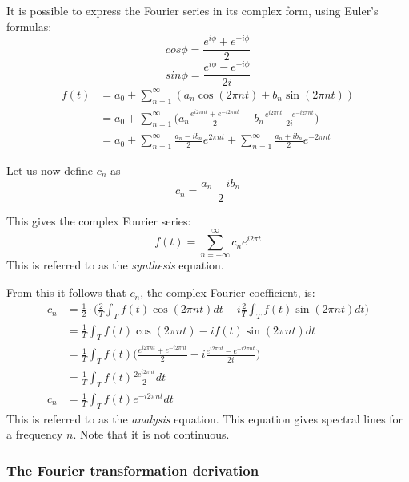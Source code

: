 \documentclass{article}
\begin{document}
It is possible to express the Fourier series in its complex form, using 
Euler's formulas:
$$cos \phi = \frac{e^{i\phi} + e^{-i\phi}}{2}$$
$$sin \phi = \frac{e^{i\phi} - e^{-i\phi}}{2i}$$
\begin{equation*}
	\begin{aligned}
		f(t) &=
		a_0 + \sum^{\infty}_{n=1}(a_n \cos(2 \pi n t) + b_n \sin(2 \pi n t)) \\
		& = a_0 + \sum^{\infty}_{n=1}\Big(
		a_n \frac{e^{i 2 \pi n t} + e^{-i 2 \pi n t}}{2} + 
		b_n \frac{e^{i 2 \pi n t} - e^{-i 2 \pi n t}}{2i}\Big) \\
		&= a_0 + \sum^{\infty}_{n=1} \frac{a_n - ib_n}{2}e^{2 \pi n t} +
		\sum^{\infty}_{n=1} \frac{a_n + ib_n}{2} e^{-2 \pi n t}
	\end{aligned}
\end{equation*}

Let us now define $c_n$ as 
$$c_n = \frac{a_n - i b_n}{2}$$

This gives the complex Fourier series:
\begin{equation*}
	f(t) = \sum^{\infty}_{n = - \infty} c_n e^{i 2 \pi t}
\end{equation*}
This is referred to as the \textit{synthesis} equation.

From this it follows that $c_n$, the complex Fourier coefficient, is:
\begin{equation*}
	\begin{aligned}
		c_n &= 
		\frac{1}{2} \cdot \bigg( \frac{2}{T} \int_T f(t) \cos(2 \pi n t) dt - 
		i \frac{2}{T} \int_T f(t) \sin(2 \pi n t) dt \bigg) \\
		&= \frac{1}{T} \int_T f(t) \cos(2 \pi n t) - i f(t) \sin(2 \pi n t) dt \\
		&= \frac{1}{T} \int_T f(t) \bigg( 
			\frac{e^{i 2 \pi n t} + e^{-i 2 \pi n t}}{2} - 
		i \frac{e^{i 2 \pi n t} - e^{-i 2 \pi n t}}{2i} \bigg) \\
		&= \frac{1}{T} \int_T f(t) \frac{2 e^{i 2 \pi n t}}{2} dt \\
		c_n &= \frac{1}{T} \int_T f(t) e^{-i 2 \pi n t} dt
	\end{aligned}
\end{equation*}
This is referred to as the \textit{analysis} equation. This equation gives 
spectral lines for a frequency $n$. Note that it is not continuous.

\subsubsection{The Fourier transformation derivation}
\end{document}
